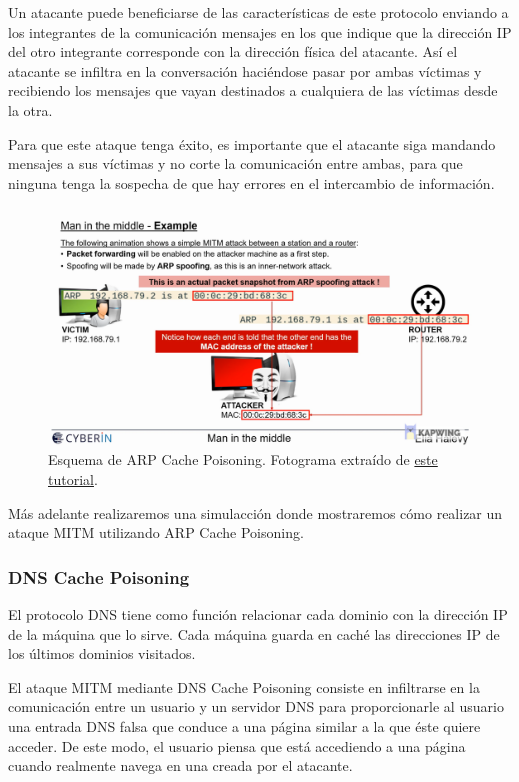 \documentclass[11pt]{article}
\begin{document}
 Un atacante puede beneficiarse de las características de este protocolo enviando a los integrantes de la comunicación mensajes en los que indique que la dirección IP del otro integrante corresponde con la dirección física del atacante. Así el atacante se infiltra en la conversación haciéndose pasar por ambas víctimas y recibiendo los mensajes que vayan destinados a cualquiera de las víctimas desde la otra. 
 
 Para que este ataque tenga éxito, es importante que el atacante siga mandando mensajes a sus víctimas y no corte la comunicación entre ambas, para que ninguna tenga la sospecha de que hay errores en el intercambio de información.
 
 \begin{figure}[H]
 	\centering
 	\includegraphics[width=120mm]{images/esquema-arp}
 	\caption{Esquema de ARP Cache Poisoning. Fotograma extraído de \href{https://www.youtube.com/watch?v=fbXu8EX0hsI}{este tutorial}.}
 \end{figure}

	Más adelante realizaremos una simulacción donde mostraremos cómo realizar un ataque MITM utilizando ARP Cache Poisoning.

\subsubsection*{DNS Cache Poisoning}

 El protocolo DNS tiene como función relacionar cada dominio con la dirección IP de la máquina que lo sirve. Cada máquina guarda en caché las direcciones IP de los últimos dominios visitados.
 
 El ataque MITM mediante DNS Cache Poisoning consiste en infiltrarse en la comunicación entre un usuario y un servidor DNS para proporcionarle al usuario una entrada DNS falsa que conduce a una página similar a la que éste quiere acceder. De este modo, el usuario piensa que está accediendo a una página cuando realmente navega en una creada por el atacante.
 
\end{document}
